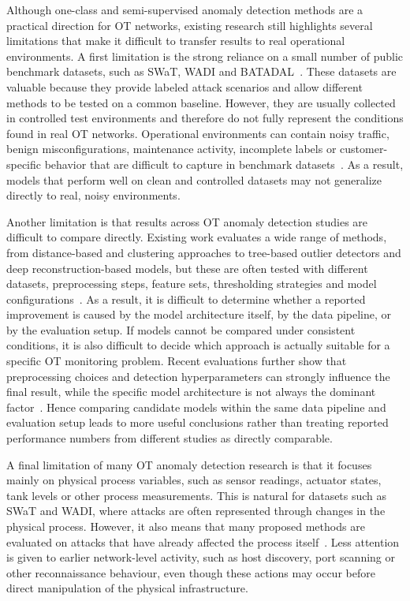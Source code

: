 Although one-class and semi-supervised anomaly detection methods are a practical direction for OT networks, existing research still highlights several limitations that make it difficult to transfer results to real operational environments. A first limitation is the strong reliance on a small number of public benchmark datasets, such as SWaT, WADI and BATADAL~\cite{atluri_perspectives_2022, abshari_survey_2025}. These datasets are valuable because they provide labeled attack scenarios and allow different methods to be tested on a common baseline. However, they are usually collected in controlled test environments and therefore do not fully represent the conditions found in real OT networks. Operational environments can contain noisy traffic, benign misconfigurations, maintenance activity, incomplete labels or customer-specific behavior that are difficult to capture in benchmark datasets~\cite{moriano_adaptive_2025, jeffrey_hybrid_2024}. As a result, models that perform well on clean and controlled datasets may not generalize directly to real, noisy environments.

Another limitation is that results across OT anomaly detection studies are difficult to compare directly. Existing work evaluates a wide range of methods, from distance-based and clustering approaches to tree-based outlier detectors and deep reconstruction-based models, but these are often tested with different datasets, preprocessing steps, feature sets, thresholding strategies and model configurations~\cite{wang_guardians_2026, atluri_perspectives_2022}. As a result, it is difficult to determine whether a reported improvement is caused by the model architecture itself, by the data pipeline, or by the evaluation setup. If models cannot be compared under consistent conditions, it is also difficult to decide which approach is actually suitable for a specific OT monitoring problem. Recent evaluations further show that preprocessing choices and detection hyperparameters can strongly influence the final result, while the specific model architecture is not always the dominant factor~\cite{atluri_perspectives_2022}. Hence comparing candidate models within the same data pipeline and evaluation setup leads to more useful conclusions rather than treating reported performance numbers from different studies as directly comparable.

A final limitation of many OT anomaly detection research is that it focuses mainly on physical process variables, such as sensor readings, actuator states, tank levels or other process measurements. This is natural for datasets such as SWaT and WADI, where attacks are often represented through changes in the physical process. However, it also means that many proposed methods are evaluated on attacks that have already affected the process itself~\cite{atluri_perspectives_2022, behdadnia_early-stage_2025}. Less attention is given to earlier network-level activity, such as host discovery, port scanning or other reconnaissance behaviour, even though these actions may occur before direct manipulation of the physical infrastructure.




